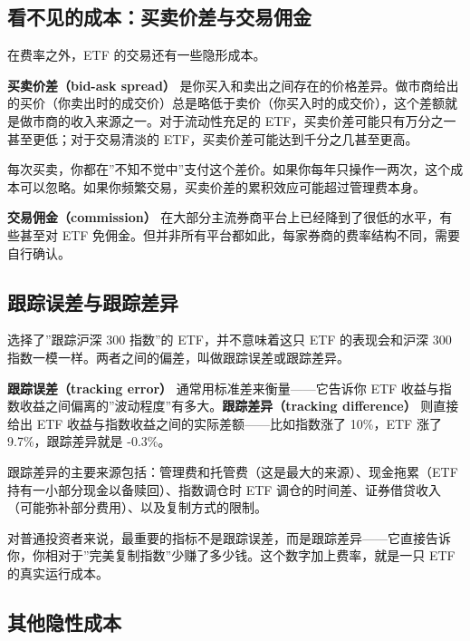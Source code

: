 \documentclass[a4paper,11pt,oneside,fontset=none,UTF8,zihao=-4]{ctexbook}
\begin{document}
\subsection{看不见的成本：买卖价差与交易佣金}\label{ux770bux4e0dux89c1ux7684ux6210ux672cux4e70ux5356ux4ef7ux5deeux4e0eux4ea4ux6613ux4f63ux91d1}

在费率之外，ETF 的交易还有一些隐形成本。

\textbf{买卖价差（bid-ask spread）}
是你买入和卖出之间存在的价格差异。做市商给出的买价（你卖出时的成交价）总是略低于卖价（你买入时的成交价），这个差额就是做市商的收入来源之一。对于流动性充足的
ETF，买卖价差可能只有万分之一甚至更低；对于交易清淡的
ETF，买卖价差可能达到千分之几甚至更高。

每次买卖，你都在''不知不觉中''支付这个差价。如果你每年只操作一两次，这个成本可以忽略。如果你频繁交易，买卖价差的累积效应可能超过管理费本身。

\textbf{交易佣金（commission）}
在大部分主流券商平台上已经降到了很低的水平，有些甚至对 ETF
免佣金。但并非所有平台都如此，每家券商的费率结构不同，需要自行确认。

\subsection{跟踪误差与跟踪差异}\label{ux8ddfux8e2aux8befux5deeux4e0eux8ddfux8e2aux5deeux5f02}

选择了''跟踪沪深 300 指数''的 ETF，并不意味着这只 ETF 的表现会和沪深 300
指数一模一样。两者之间的偏差，叫做跟踪误差或跟踪差异。

\textbf{跟踪误差（tracking error）} 通常用标准差来衡量------它告诉你 ETF
收益与指数收益之间偏离的''波动程度''有多大。\textbf{跟踪差异（tracking
difference）} 则直接给出 ETF
收益与指数收益之间的实际差额------比如指数涨了 10\%，ETF 涨了
9.7\%，跟踪差异就是 -0.3\%。

跟踪差异的主要来源包括：管理费和托管费（这是最大的来源）、现金拖累（ETF
持有一小部分现金以备赎回）、指数调仓时 ETF
调仓的时间差、证券借贷收入（可能弥补部分费用）、以及复制方式的限制。

对普通投资者来说，最重要的指标不是跟踪误差，而是跟踪差异------它直接告诉你，你相对于''完美复制指数''少赚了多少钱。这个数字加上费率，就是一只
ETF 的真实运行成本。

\subsection{其他隐性成本}\label{ux5176ux4ed6ux9690ux6027ux6210ux672c}
\end{document}
